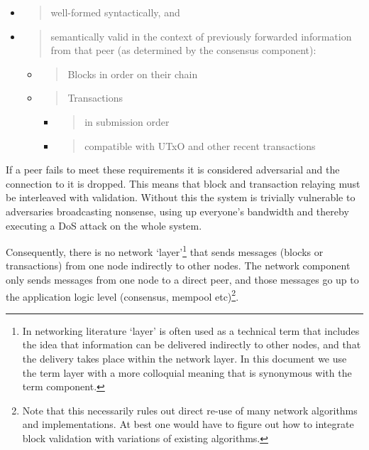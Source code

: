 \documentclass[11pt,a4paper]{article}
\begin{document}
\begin{itemize}
\item
  \begin{quote}
  well-formed syntactically, and
  \end{quote}
\item
  \begin{quote}
  semantically valid in the context of previously forwarded information
  from that peer (as determined by the consensus component):
  \end{quote}

  \begin{itemize}
  \item
    \begin{quote}
    Blocks in order on their chain
    \end{quote}
  \item
    \begin{quote}
    Transactions
    \end{quote}

    \begin{itemize}
    \item
      \begin{quote}
      in submission order
      \end{quote}
    \item
      \begin{quote}
      compatible with UTxO and other recent transactions
      \end{quote}
    \end{itemize}
  \end{itemize}
\end{itemize}

If a peer fails to meet these requirements it is considered adversarial
and the connection to it is dropped. This means that block and
transaction relaying must be interleaved with validation. Without this
the system is trivially vulnerable to adversaries broadcasting nonsense,
using up everyone's bandwidth and thereby executing a DoS attack on the
whole system.

Consequently, there is no network `layer'\footnote{In networking
  literature `layer' is often used as a technical term that includes the
  idea that information can be delivered indirectly to other nodes, and
  that the delivery takes place within the network layer. In this
  document we use the term layer with a more colloquial meaning that is
  synonymous with the term component.} that sends messages (blocks or
transactions) from one node indirectly to other nodes. The network
component only sends messages from one node to a direct peer, and those
messages go up to the application logic level (consensus, mempool
etc)\footnote{Note that this necessarily rules out direct re-use of many
  network algorithms and implementations. At best one would have to
  figure out how to integrate block validation with variations of
  existing algorithms.}.
\end{document}
